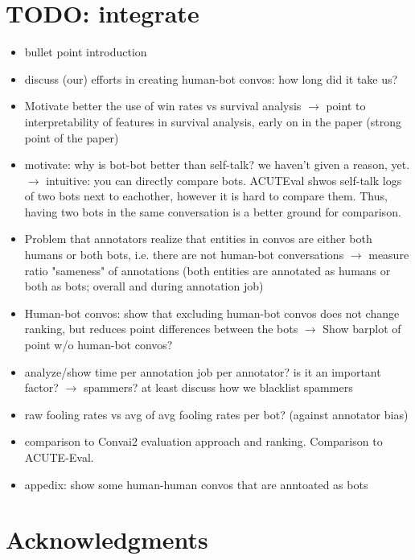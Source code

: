 \documentclass[11pt,a4paper]{article}
\begin{document}
\section*{TODO: integrate}
\begin{itemize}
    \item bullet point introduction
    \item discuss (our) efforts in creating human-bot convos: how long did it take us?
    \item Motivate better the use of win rates vs survival analysis $\rightarrow$ point to interpretability of features in survival analysis, early on in the paper (strong point of the paper)
    \item motivate: why is bot-bot better than self-talk? we haven't given a reason, yet. $\rightarrow$ intuitive: you can directly compare bots. ACUTEval shwos self-talk logs of two bots next to eachother, however it is hard to compare them. Thus, having two bots in the same conversation is a better ground for comparison.
    \item Problem that annotators realize that entities in convos are either both humans or both bots, i.e. there are not human-bot conversations $\rightarrow$ measure ratio "sameness" of annotations (both entities are annotated as humans or both as bots; overall and during annotation job)
    \item Human-bot convos: show that excluding human-bot convos does not change ranking, but reduces point differences between the bots $\rightarrow$ Show barplot of point w/o human-bot convos?
    \item analyze/show time per annotation job per annotator? is it an important factor? $\rightarrow$ spammers? at least discuss how we blacklist spammers
    \item raw fooling rates vs avg of avg fooling rates per bot? (against annotator bias)
    \item comparison to Convai2 evaluation approach and ranking. Comparison to ACUTE-Eval.
    \item appedix: show some human-human convos that are anntoated as bots

\end{itemize}

\section*{Acknowledgments}



\newpage
\appendix
\end{document}
